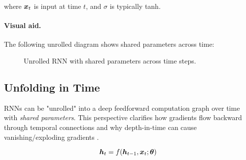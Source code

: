 where $\boldsymbol{x}_t$ is input at time $t$, and $\sigma$ is typically tanh.

\paragraph{Visual aid.} The following unrolled diagram shows shared parameters across time:
\begin{figure}[h]
    \centering
    \caption{Unrolled RNN with shared parameters across time steps.}
\end{figure}

\subsection{Unfolding in Time}

RNNs can be "unrolled" into a deep feedforward computation graph over time with \emph{shared parameters}. This perspective clarifies how gradients flow backward through temporal connections and why depth-in-time can cause vanishing/exploding gradients \cite{GoodfellowEtAl2016}.

\begin{equation}
\boldsymbol{h}_t = f(\boldsymbol{h}_{t-1}, \boldsymbol{x}_t; \boldsymbol{\theta})
\end{equation}

